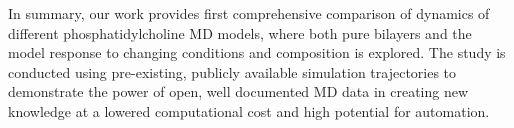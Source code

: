 \documentclass[journal=jpcbfk,manuscript=article,layout=twocolumn]{achemso}
\begin{document}

In summary, our work provides first comprehensive comparison of dynamics of different phosphatidylcholine MD models, where both pure bilayers and the model response to changing conditions and composition is explored. The study is conducted using pre-existing, publicly available simulation trajectories to demonstrate the power of open, well documented MD data in creating new knowledge at a lowered computational cost and high potential for automation.  






\end{document}
